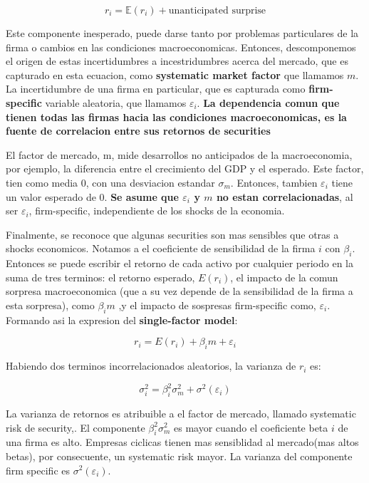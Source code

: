 \documentclass{article}
\begin{document}
\[
r_i = \mathbb{E}(r_i) + \text{unanticipated surprise}
\]

Este componente inesperado, puede darse tanto por problemas particulares de la firma o cambios en las condiciones macroeconomicas. 
Entonces, descomponemos el origen de estas incertidumbres a incestridumbres acerca del mercado, que es capturado en esta ecuacion,
como \textbf{systematic market factor} que llamamos \textbf{$m$}. La incertidumbre de una firma en particular, que es capturada como 
\textbf{firm-specific} variable aleatoria, que llamamos \textbf{$\varepsilon_i$}. \textbf{La dependencia comun que tienen todas las
 firmas hacia las condiciones macroeconomicas, es la fuente de correlacion entre sus retornos de securities} 

El factor de mercado, m, mide desarrollos no anticipados de la macroeconomia, por ejemplo, la diferencia entre el crecimiento
del GDP y el esperado. Este factor, tien como media 0, con una desviacion estandar $\sigma_m$. Entonces, tambien $\varepsilon_i$ tiene un 
valor esperado de 0. \textbf{Se asume que $\varepsilon_i$ y $m$ no estan correlacionadas}, al ser $\varepsilon_i$, firm-specific, independiente
de los shocks de la economia.
\newpage

Finalmente, se reconoce que algunas securities son mas sensibles que otras a shocks economicos. Notamos a el coeficiente de sensibilidad 
de la firma $i$ con $\beta_i$. Entonces se puede escribir el retorno de cada activo por cualquier periodo en la suma de tres terminos:
 el retorno esperado, $E(r_i)$, el impacto de la comun sorpresa macroeconomica (que a su vez depende de la sensibilidad de la firma a 
 esta sorpresa), como $\beta_i m$ ,y el impacto de sospresas firm-specific como, $\varepsilon_i$. Formando asi la expresion del 
 \textbf{single-factor model}:

 \[
r_i = E(r_i) + \beta_i m + \varepsilon_i
\]

Habiendo dos terminos incorrelacionados aleatorios, la varianza de $r_i$ es:

\[
\sigma_i^2 = \beta_i^2 \sigma_m^2 + \sigma^2(\varepsilon_i)
\]

La varianza de retornos es atribuible a el factor de mercado, llamado systematic risk de security,. El componente $\beta_i^2 \sigma_m^2$ es mayor
cuando el coeficiente beta $i$ de una firma es alto. Empresas ciclicas tienen mas sensiblidad al mercado(mas altos betas), por consecuente, 
un systematic risk mayor. La varianza del componente firm specific es $\sigma^2(\varepsilon_i)$.
\end{document}
